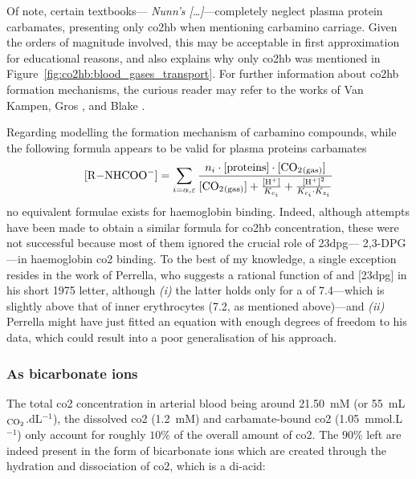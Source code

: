 Of note, certain textbooks---\eg{} \textit{Nunn's [\dots]}\cite[Chap.~10]{nunns}---completely neglect plasma protein carbamates, presenting only \gls{co2hb} when mentioning carbamino carriage. Given the orders of magnitude involved, this may be acceptable in first approximation for educational reasons, and also explains why only \gls{co2hb} was mentioned in Figure~\ref{fig:co2hb:blood_gases_transport}. For further information about \gls{co2hb} formation mechanisms, the curious reader may refer to the works of Van Kampen\cite{vankampen1972_phd}, Gros \etal{}\cite{gros1981}, and Blake \etal{}\cite{blake2022}.

Regarding modelling the formation mechanism of carbamino compounds, while the following formula appears to be valid for plasma proteins carbamates\cite{klocke1987}
\begin{equation}
	\ce{[R-NHCOO^-]} = \sum_{i=\alpha, \varepsilon} \frac{n_i \cdot [\text{proteins}] \cdot \ce{[CO2_{(gas)}]}}{\ce{[CO2_{(gas)}]} + \frac{\ce{[H+]}}{K_{c_i}} + \frac{\ce{[H+]}^2}{K_{c_i} \cdot K_{z_i}} }
\end{equation}
no equivalent formulae exists for haemoglobin binding. Indeed, although attempts have been made to obtain a similar formula for \gls{co2hb} concentration, these were not successful because most of them ignored the crucial role of \gls{23dpg}---\aka{} 2,3-DPG---in haemoglobin \gls{co2} binding\cite{gros1981, klocke1987}. To the best of my knowledge, a single exception resides in the work of Perrella,  who suggests a rational function of \ce{[CO2_{(gas)}]} and [\gls{23dpg}] in his short 1975 letter\cite{perrella1975a}, although \emph{(i)} the latter holds only for a \pH{} of 7.4---which is slightly above that of inner erythrocytes (7.2, as mentioned above)---and \emph{(ii)} Perrella might have just fitted an equation with enough degrees of freedom to his data, which could result into a poor generalisation of his approach.

\subsubsection{As bicarbonate ions}\label{subsect:co2hb:bicarb}

The total \gls{co2} concentration in arterial blood being around 21.50~mM (or 55~mL$_{\ce{CO_2}}$.dL$^{-1}$), the dissolved \gls{co2} (1.2~mM) and carbamate-bound \gls{co2} (1.05~mmol.L$^{-1}$) only account for roughly $10\%$ of the overall amount of \gls{co2}\cite{geers2000}. The $90\%$ left are indeed present in the form of bicarbonate ions which are created through the hydration and dissociation of \gls{co2}, which is a di-acid:

